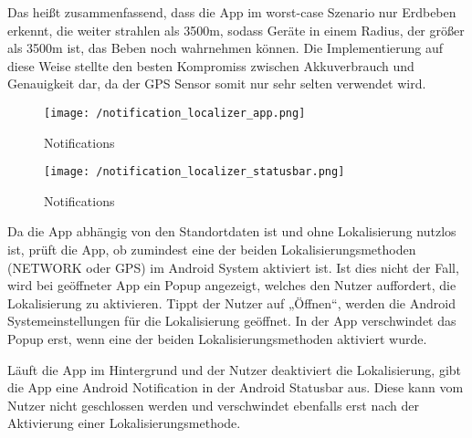 Das heißt zusammenfassend, dass die App im worst-case Szenario nur Erdbeben erkennt, die weiter strahlen als 3500m, sodass Geräte in einem Radius, der größer als 3500m ist, das Beben noch wahrnehmen können.
Die Implementierung auf diese Weise stellte den besten Kompromiss zwischen Akkuverbrauch und Genauigkeit dar, da der GPS Sensor somit nur sehr selten verwendet wird.
\par\bigskip
\begin{wrapfigure}{r}{45mm}
	\centering
 	\vspace*{-10mm}
	\label{notification_localizer_app}{
    \texttt{[image: /notification\_localizer\_app.png]}}
    \vspace*{-2mm}
    \caption[Lokalisierung: Notification in der App]{Notifications}
	\vspace*{5mm}
	\label{notification_localizer_statusbar}{
    \texttt{[image: /notification\_localizer\_statusbar.png]}}
    \vspace*{-2mm}
    \caption[Lokalisierung: Notification bei geschlossener App]{Notifications}
    \vspace*{-10mm}
\end{wrapfigure}
Da die App abhängig von den Standortdaten ist und ohne Lokalisierung nutzlos ist, prüft die App, ob zumindest eine der beiden Lokalisierungsmethoden (NETWORK oder GPS) im Android System aktiviert ist. Ist dies nicht der Fall, wird bei geöffneter App ein Popup angezeigt, welches den Nutzer auffordert, die  Lokalisierung zu aktivieren. Tippt der Nutzer auf „Öffnen“, werden die Android Systemeinstellungen für die Lokalisierung geöffnet. In der App verschwindet das Popup erst, wenn eine der beiden Lokalisierungsmethoden aktiviert wurde. 
\par\bigskip
Läuft die App im Hintergrund und der Nutzer deaktiviert die Lokalisierung, gibt die App eine Android Notification in der Android Statusbar aus. Diese kann vom Nutzer nicht geschlossen werden und verschwindet ebenfalls erst nach der Aktivierung einer Lokalisierungsmethode.

